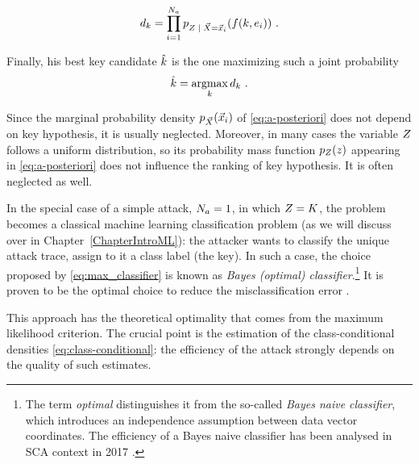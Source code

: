 \begin{equation}\label{eq:joint_distr}
d_{\keyVar} = \prod_{i=1}^{\nbAttackTraces} \pdf_{\given{\sensRandVar}{\vaLeakVec = \vLeakVec_i}}(\sensFunction(\keyVar,\publicParVar_i) ) \mbox{ .}
\end{equation}

Finally, his best key candidate $\hat{k}$ is the one maximizing such a joint probability
\begin{equation}\label{eq:max_classifier}
\hat{k} = \operatorname*{argmax}_{k} d_{k} \mbox{ .}
\end{equation}

\begin{remark}Since the marginal probability density $p_{\vec{X}}(\vec{x}_i)$ of \eqref{eq:a-posteriori} does not depend on key hypothesis, it is usually neglected. Moreover, in many cases the variable $Z$ follows a uniform distribution, so its probability mass function $p_{Z}(z)$ appearing in \eqref{eq:a-posteriori}  does not influence the ranking of key hypothesis. It is often neglected as well. 
\end{remark}

\begin{remark}
In the special case of a simple attack, \ie $N_a = 1$, in which $Z = K$, the problem becomes a classical machine learning classification problem (as we will discuss over in Chapter~\ref{ChapterIntroML}): the attacker wants to classify the unique attack trace, \ie assign to it a class label (the key). In such a case, the choice proposed by \eqref{eq:max_classifier} is known as \emph{Bayes (optimal) classifier}.\footnote{The term \emph{optimal} distinguishes it from the so-called \emph{Bayes naive classifier}, which introduces an independence assumption between data vector coordinates. The efficiency of a Bayes naive classifier has been analysed in SCA context in 2017 \cite{picek2017template}.} It is proven to be the optimal choice to reduce the misclassification error \cite{christopher2006pattern}.
\end{remark}

This approach has the theoretical optimality that comes from the maximum likelihood criterion. The crucial point is the estimation of the class-conditional densities \eqref{eq:class-conditional}: the efficiency of the attack strongly depends on the quality of such estimates. 

